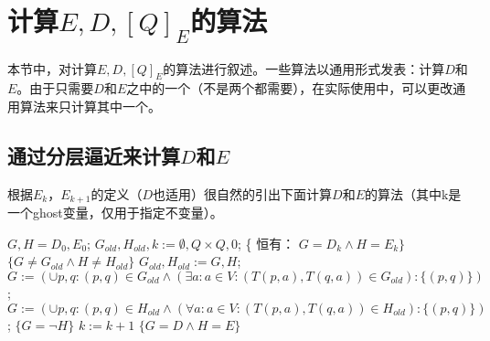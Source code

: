 
\chapter{计算$E,D,[Q]_E$的算法}
本节中，对计算$E,D,[Q]_E$的算法进行叙述。一些算法以通用形式发表：计算$D$和$E$。由于只需要$D$和$E$之中的一个（不是两个都需要），在实际使用中，可以更改通用算法来只计算其中一个。

\section{通过分层逼近来计算$D$和$E$}

根据$E_k$，$E_{k+1}$的定义（$D$也适用）很自然的引出下面计算$D$和$E$的算法（其中k是一个ghost变量，仅用于指定不变量）。

\begin{algorithm}
    \caption{}\label{euclid}
    \begin{algorithmic}[1]
        \State $G,H=D_0,E_0$;
        \State $G_{old},H_{old},k:=\emptyset ,Q \times Q,0$;
        \State \{ 恒有： $G=D_k \land H =E_k \}$
            \State $\{G \not= G_{old} \land H \not= H_{old} \}$
            \State $G_{old},H_{old}:=G,H$;
            \State $G:=(\cup  p,q:(p,q)\in G_{old}\land (\exists  a:a \in V : (T(p,a),T(q,a))\in G_{old} ) : \{(p,q)\})$;
            \State $G:=(\cup  p,q:(p,q)\in H_{old}\land (\forall  a:a \in V : (T(p,a),T(q,a))\in H_{old} ) : \{(p,q)\})$;
            \State $\{G=\neg H\}$
            \State $k:=k+1$
        \Until $ \{ G=D \land H=E \}$
    \end{algorithmic}
\end{algorithm}

